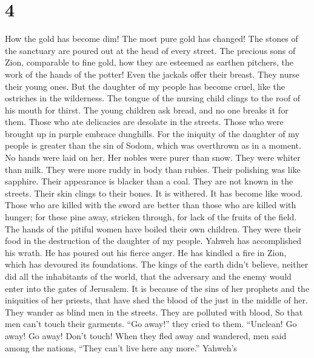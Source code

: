 \hypertarget{section-3}{%
\section{4}\label{section-3}}

 How the gold has become dim! The most pure gold has
changed! The stones of the sanctuary are poured out at the head of every
street.  The precious sons of Zion, comparable to fine
gold, how they are esteemed as earthen pitchers, the work of the hands
of the potter!  Even the jackals offer their breast. They
nurse their young ones. But the daughter of my people has become cruel,
like the ostriches in the wilderness.  The tongue of the
nursing child clings to the roof of his mouth for thirst. The young
children ask bread, and no one breaks it for them.  Those
who ate delicacies are desolate in the streets. Those who were brought
up in purple embrace dunghills.  For the iniquity of the
daughter of my people is greater than the sin of Sodom, which was
overthrown as in a moment. No hands were laid on her.  Her
nobles were purer than snow. They were whiter than milk. They were more
ruddy in body than rubies. Their polishing was like sapphire.
 Their appearance is blacker than a coal. They are not
known in the streets. Their skin clings to their bones. It is withered.
It has become like wood.  Those who are killed with the
sword are better than those who are killed with hunger; for these pine
away, stricken through, for lack of the fruits of the field.
 The hands of the pitiful women have boiled their own
children. They were their food in the destruction of the daughter of my
people.  Yahweh has accomplished his wrath. He has poured
out his fierce anger. He has kindled a fire in Zion, which has devoured
its foundations.  The kings of the earth didn't believe,
neither did all the inhabitants of the world, that the adversary and the
enemy would enter into the gates of Jerusalem.  It is
because of the sins of her prophets and the iniquities of her priests,
that have shed the blood of the just in the middle of her.
 They wander as blind men in the streets. They are
polluted with blood, So that men can't touch their garments.
 ``Go away!'' they cried to them. ``Unclean! Go away! Go
away! Don't touch! When they fled away and wandered, men said among the
nations, ``They can't live here any more.''  Yahweh's
